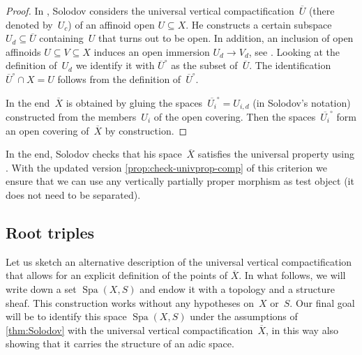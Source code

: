 \documentclass[a4paper,twoside,11pt,reqno]{amsart}
\DeclareMathOperator{\Spa}{Spa}
\newcommand{\ov}[1]{\overline{#1}}
\theoremstyle{definition}
\numberwithin{equation}{subsection}
\begin{document}
\begin{proof}
     In \cite{Solodov-vertical-compactification}, Solodov considers the universal vertical compactification~$\ov U$ (there denoted by~$U_c$) of an affinoid open $U \subseteq X$.
    He constructs a certain subspace $U_d \subseteq \ov U$ containing~$U$ that turns out to be open.
    In addition, an inclusion of open affinoids $U \subseteq V \subseteq X$ induces an open immersion $U_d \to V_d$, see \cite[Lemma~3.27]{Solodov-vertical-compactification}.
    Looking at the definition of~$U_d$ we identify it with $\ov{U}^\circ$ as the subset of~$\ov U$. The identification $\ov{U}^\circ \cap X = U$ follows from the definition of~$\ov{U}^\circ$.

    In the end~$\ov X$ is obtained by gluing the spaces~$\ov{U_i}^\circ = U_{i,d}$ (in Solodov's notation) constructed from the members~$U_i$ of the open covering.
    Then the spaces~$\ov{U_i}^\circ$ form an open covering of~$\ov X$ by construction.   
\end{proof}


In the end, Solodov checks that his space~$\ov X$ satisfies the universal property using \cite[Lemma~3.19~iv)]{Solodov-vertical-compactification}.
With the updated version \cref{prop:check-univprop-comp} of this criterion we ensure that we can use any vertically partially proper morphism as test object (it does not need to be separated).

\subsection{Root triples} 
\label{sec:root-triples}

Let us sketch an alternative description of the universal vertical compactification that allows for an explicit definition of the points of $\overline{X}$.
In what follows, we will write down a set $\Spa(X,S)$ and endow it with a topology and a structure sheaf.
This construction works without any hypotheses on~$X$ or~$S$.
Our final goal will be to identify this space $\Spa(X,S)$ under the assumptions of \cref{thm:Solodov} with the universal vertical compactification~$\overline{X}$, in this way also showing that it carries the structure of an adic space. 
\end{document}
